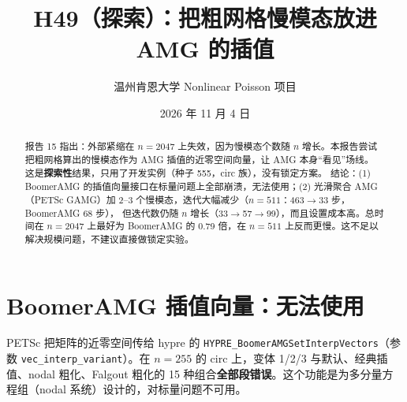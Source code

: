 \documentclass[11pt,a4paper]{ctexart}
\title{H49（探索）：把粗网格慢模态放进 AMG 的插值}
\author{温州肯恩大学 \quad Nonlinear Poisson 项目}
\date{2026 年 11 月 4 日}
\begin{document}
\sloppy
\maketitle
\begin{abstract}
报告 15 指出：外部紧缩在 $n=2047$ 上失效，因为慢模态个数随 $n$ 增长。本报告尝试把粗网格算出的慢模态作为 AMG 插值的近零空间向量，让 AMG 本身“看见”场线。
这是\textbf{探索性}结果，只用了开发实例（种子 555，circ 族），没有锁定方案。
结论：(1) BoomerAMG 的插值向量接口在标量问题上全部崩溃，无法使用；(2) 光滑聚合 AMG（PETSc GAMG）加 2--3 个慢模态，迭代大幅减少（$n=511$：463$\to$33 步，BoomerAMG 68 步），
但迭代数仍随 $n$ 增长（33$\to$57$\to$99），而且设置成本高。总时间在 $n=2047$ 上最好为 BoomerAMG 的 0.79 倍，在 $n=511$ 上反而更慢。这不足以解决规模问题，不建议直接做锁定实验。
\end{abstract}

\section{BoomerAMG 插值向量：无法使用}
PETSc 把矩阵的近零空间传给 hypre 的 \texttt{HYPRE\_BoomerAMGSetInterpVectors}（参数 \texttt{vec\_interp\_variant}）。在 $n=255$ 的 circ 上，变体 1/2/3 与默认、经典插值、nodal 粗化、Falgout 粗化的 15 种组合\textbf{全部段错误}。这个功能是为多分量方程组（nodal 系统）设计的，对标量问题不可用。
\end{document}

